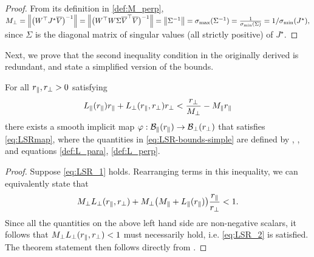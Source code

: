 \documentclass[letterpaper, 10 pt, conference]{ieeeconf}
\begin{document}
\begin{proof}
    From its definition in \eqref{def:M_perp},
    \(
    M_{\perp} = \left\lVert{\bigl(W^{\top} J^{\star} \ensuremath{\overline{V}}\bigr)^{-1}}\right\rVert
    = \left\lVert{\bigl(W^{\top} W\Sigma\ensuremath{\overline{V}}^{\top} \ensuremath{\overline{V}}\bigr)^{-1}}\right\rVert
    = \left\lVert{\Sigma^{-1}}\right\rVert = \sigma_{\max}(\Sigma^{-1}) = \frac{1}{\sigma_{\min}(\Sigma)} \\
    = 1/\sigma_{\min}(J^{\star}),
    \)
    since \(\Sigma\) is the diagonal matrix of singular values (all strictly positive) of \(J^{\star}\).
\end{proof}

Next, we prove that the second inequality condition in the originally derived  is redundant, and state a simplified version of the bounds.
\begin{theorem} \label{thm:LSR-bounds-simple}
    For all \(r_{\parallel},r_{\perp}>0\) satisfying
    \begin{equation}
        L_{\parallel}(r_{\parallel})r_{\parallel} + L_{\perp}(r_{\parallel},r_{\perp})r_{\perp}  < \frac{r_{\perp}}{M_{\perp}} - M_{\parallel}r_{\parallel} \label{eq:LSR-bounds-simple}
    \end{equation}
    there exists a smooth implicit map \(\varphi : \mathcal{B}_{\parallel}(r_{\parallel}) \to \mathcal{B}_{\perp}(r_{\perp})\) that satisfies \eqref{eq:LSRmap}, where the quantities in \eqref{eq:LSR-bounds-simple} are defined by , , and equations \eqref{def:L_para}, \eqref{def:L_perp}.
\end{theorem}
\begin{proof}
    Suppose \eqref{eq:LSR_1} holds. Rearranging terms in this inequality, we can equivalently state that
    \begin{equation*}
        M_{\perp} L_{\perp}(r_{\parallel},r_{\perp}) + M_{\perp} \big(M_{\parallel} + L_{\parallel}(r_{\parallel})\big) \frac{r_{\parallel}}{r_{\perp}} < 1.
    \end{equation*}
    Since all the quantities on the above left hand side are non-negative scalars, it follows that \(M_{\perp} L_{\perp}(r_{\parallel},r_{\perp}) < 1\) must necessarily hold, i.e. \eqref{eq:LSR_2} is satisfied. The theorem statement then follows directly from .
\end{proof}
\end{document}
